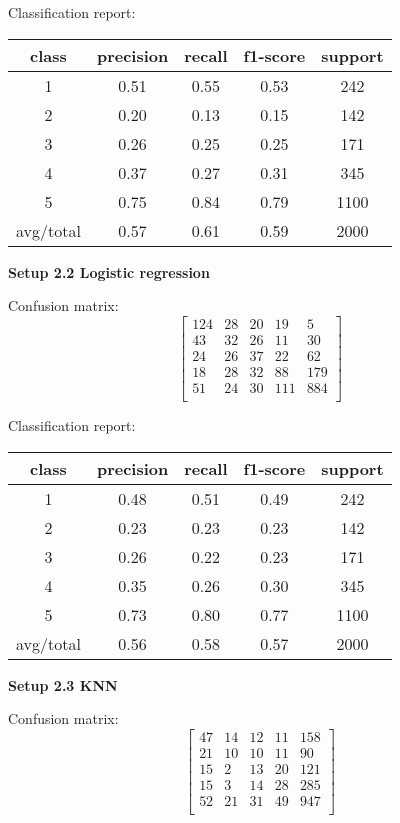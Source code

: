 \documentclass[12pt]{report}
\begin{document}
Classification report:

\begin{center}
	\begin{tabular}{c | c | c | c | c }
		\hline
		class & precision & recall & f1-score & support \\ \hline
		1 & 0.51 & 0.55 & 0.53 & 242 \\ \hline
		2 & 0.20 & 0.13 & 0.15 & 142 \\ \hline
		3 & 0.26 & 0.25 & 0.25 & 171 \\ \hline
		4 & 0.37 & 0.27 & 0.31 & 345 \\ \hline
		5 & 0.75 & 0.84 & 0.79 & 1100 \\ \hline
		avg/total & 0.57 & 0.61 & 0.59 & 2000 \\ \hline
	\end{tabular}
\end{center}

\textbf{Setup 2.2 Logistic regression}

Confusion matrix:
\[
\begin{bmatrix}
124 & 28 & 20 & 19 & 5 \\
43 & 32 & 26 & 11 & 30 \\
24 & 26 & 37 & 22 & 62 \\
18 & 28 & 32 & 88 & 179 \\
51 & 24 & 30 & 111 & 884 \\
\end{bmatrix}
\]

Classification report:

\begin{center}
	\begin{tabular}{c | c | c | c | c }
		\hline
		class & precision & recall & f1-score & support \\ \hline
		1 & 0.48 & 0.51 & 0.49 & 242 \\ \hline
		2 & 0.23 & 0.23 & 0.23 & 142 \\ \hline
		3 & 0.26 & 0.22 & 0.23 & 171 \\ \hline
		4 & 0.35 & 0.26 & 0.30 & 345 \\ \hline
		5 & 0.73 & 0.80 & 0.77 & 1100 \\ \hline
		avg/total & 0.56 & 0.58 & 0.57 & 2000 \\ \hline
	\end{tabular}
\end{center}

\textbf{Setup 2.3 KNN}

Confusion matrix:
\[
\begin{bmatrix}
47 & 14 & 12 & 11 & 158 \\
21 & 10 & 10 & 11 & 90 \\
15 & 2 & 13 & 20 & 121 \\
15 & 3 & 14 & 28 & 285 \\
52 & 21 & 31 & 49 & 947 \\
\end{bmatrix}
\]
\end{document}
